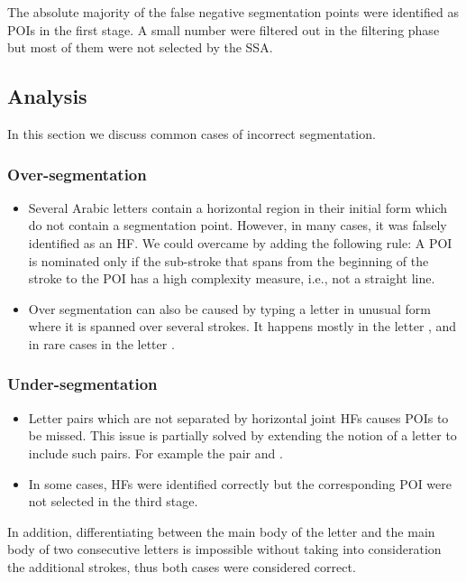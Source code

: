 \documentclass[10pt, conference, compsocconf]{IEEEtran}
\begin{document}
The absolute majority of the false negative segmentation points were identified as POIs in the first stage. A small number were filtered out in the filtering phase but most of them were not selected by the SSA.

\subsection{Analysis}
In this section we discuss common cases of incorrect segmentation.
\subsubsection{Over-segmentation}
\begin{itemize}
\item Several Arabic letters contain a horizontal region in their initial form which do not contain a segmentation point. However, in many cases, it was falsely identified as an HF. We could overcame by adding the following rule: A POI is nominated only if the sub-stroke that spans from the beginning of the stroke to the POI has a high complexity measure, i.e., not a straight line.
\item Over segmentation can also be caused by typing a letter in unusual form where it is spanned over several strokes. 
It happens mostly in the letter ,  and in rare cases in the letter .\\
\end{itemize}

\subsubsection{Under-segmentation}
\begin{itemize}
\item Letter pairs which are not separated by horizontal joint HFs causes POIs to be missed. This issue is partially solved by extending the notion of a letter to include such pairs. For example the pair  and .
\item In some cases, HFs were identified correctly but the corresponding POI were not selected in the third stage. \\
\end{itemize}

In addition, differentiating between the main body of the letter  and the main body of two consecutive  letters is impossible without taking into consideration the additional strokes, thus both cases were considered correct.
\end{document}
